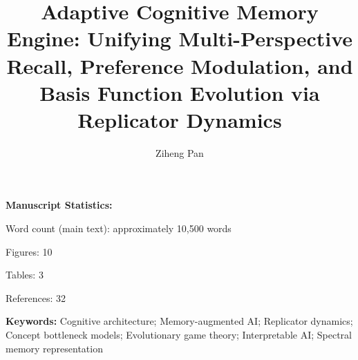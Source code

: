 \documentclass[review]{elsarticle}
\begin{document}
\begin{frontmatter}

\title{Adaptive Cognitive Memory Engine: Unifying Multi-Perspective Recall,
Preference Modulation, and Basis Function Evolution via Replicator Dynamics}

\author[1]{Ziheng Pan}

\address[1]{Independent Researcher}


\end{frontmatter}

\vspace{2cm}

\noindent\textbf{Manuscript Statistics:}

\noindent Word count (main text): approximately 10,500 words

\noindent Figures: 10

\noindent Tables: 3

\noindent References: 32

\noindent\textbf{Keywords:} Cognitive architecture; Memory-augmented AI;
Replicator dynamics; Concept bottleneck models; Evolutionary game theory;
Interpretable AI; Spectral memory representation
\end{document}
